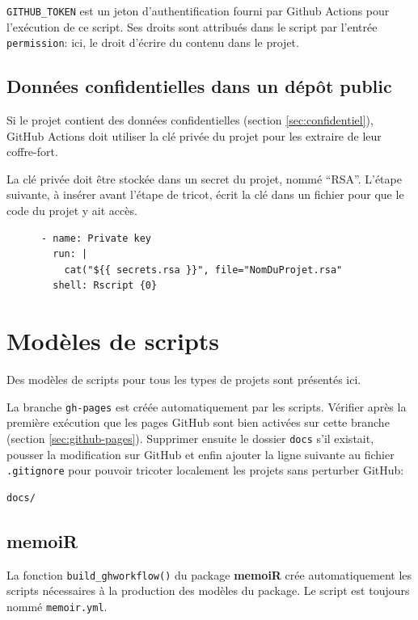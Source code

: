 \documentclass[
  12pt,
  french,
  a4paper,
  extrafontsizes,onecolumn,openright
  ]{memoir}
\begin{document}
\texttt{GITHUB\_TOKEN} est un jeton d'authentification fourni par Github Actions pour l'exécution de ce script.
Ses droits sont attribués dans le script par l'entrée \texttt{permission}: ici, le droit d'écrire du contenu dans le projet.

\subsection{Données confidentielles dans un dépôt public}\label{sec:confidentielCI}

Si le projet contient des données confidentielles (section \ref{sec:confidentiel}), GitHub Actions doit utiliser la clé privée du projet pour les extraire de leur coffre-fort.

La clé privée doit être stockée dans un secret du projet, nommé \enquote{RSA}.
L'étape suivante, à insérer avant l'étape de tricot, écrit la clé dans un fichier pour que le code du projet y ait accès.

\begin{verbatim}
      - name: Private key
        run: |
          cat("${{ secrets.rsa }}", file="NomDuProjet.rsa"
        shell: Rscript {0}
\end{verbatim}

\section{Modèles de scripts}\label{moduxe8les-de-scripts}

Des modèles de scripts pour tous les types de projets sont présentés ici.

La branche \texttt{gh-pages} est créée automatiquement par les scripts.
Vérifier après la première exécution que les pages GitHub sont bien activées sur cette branche (section \ref{sec:github-pages}).
Supprimer ensuite le dossier \texttt{docs} s'il existait, pousser la modification sur GitHub et enfin ajouter la ligne suivante au fichier \texttt{.gitignore} pour pouvoir tricoter localement les projets sans perturber GitHub:

\begin{verbatim}
docs/
\end{verbatim}

\subsection{memoiR}\label{sec:memoiR-ci}

La fonction \texttt{build\_ghworkflow()} du package \textbf{memoiR} crée automatiquement les scripts nécessaires à la production des modèles du package.
Le script est toujours nommé \texttt{memoir.yml}.
\end{document}
